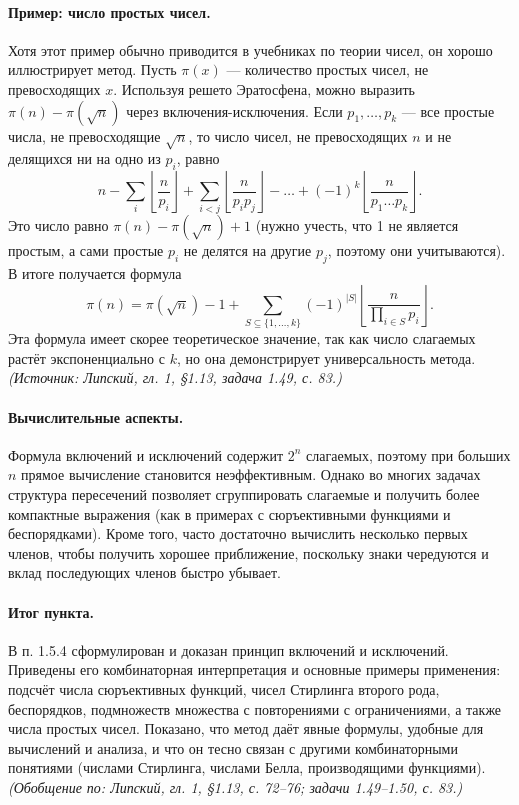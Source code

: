\documentclass[a4paper,12pt]{article}
\begin{document}
\paragraph{Пример: число простых чисел.}
Хотя этот пример обычно приводится в учебниках по теории чисел, он хорошо иллюстрирует метод. Пусть \(\pi(x)\) — количество простых чисел, не превосходящих \(x\). Используя решето Эратосфена, можно выразить \(\pi(n) - \pi(\sqrt{n})\) через включения-исключения. Если \(p_1,\dots,p_k\) — все простые числа, не превосходящие \(\sqrt{n}\), то число чисел, не превосходящих \(n\) и не делящихся ни на одно из \(p_i\), равно
\[
n - \sum_i \left\lfloor\frac{n}{p_i}\right\rfloor + \sum_{i<j} \left\lfloor\frac{n}{p_ip_j}\right\rfloor - \dots + (-1)^k \left\lfloor\frac{n}{p_1\dots p_k}\right\rfloor.
\]
Это число равно \(\pi(n) - \pi(\sqrt{n}) + 1\) (нужно учесть, что 1 не является простым, а сами простые \(p_i\) не делятся на другие \(p_j\), поэтому они учитываются). В итоге получается формула
\[
\pi(n) = \pi(\sqrt{n}) - 1 + \sum_{S\subseteq\{1,\dots,k\}} (-1)^{|S|} \left\lfloor\frac{n}{\prod_{i\in S}p_i}\right\rfloor.
\]
Эта формула имеет скорее теоретическое значение, так как число слагаемых растёт экспоненциально с \(k\), но она демонстрирует универсальность метода.
\textit{(Источник: Липский, гл. 1, §1.13, задача 1.49, с. 83.)}

\paragraph{Вычислительные аспекты.}
Формула включений и исключений содержит \(2^n\) слагаемых, поэтому при больших \(n\) прямое вычисление становится неэффективным. Однако во многих задачах структура пересечений позволяет сгруппировать слагаемые и получить более компактные выражения (как в примерах с сюръективными функциями и беспорядками). Кроме того, часто достаточно вычислить несколько первых членов, чтобы получить хорошее приближение, поскольку знаки чередуются и вклад последующих членов быстро убывает.

\paragraph{Итог пункта.}
В п. 1.5.4 сформулирован и доказан принцип включений и исключений. Приведены его комбинаторная интерпретация и основные примеры применения: подсчёт числа сюръективных функций, чисел Стирлинга второго рода, беспорядков, подмножеств множества с повторениями с ограничениями, а также числа простых чисел. Показано, что метод даёт явные формулы, удобные для вычислений и анализа, и что он тесно связан с другими комбинаторными понятиями (числами Стирлинга, числами Белла, производящими функциями).
\textit{(Обобщение по: Липский, гл. 1, §1.13, с. 72--76; задачи 1.49--1.50, с. 83.)}
\end{document}

